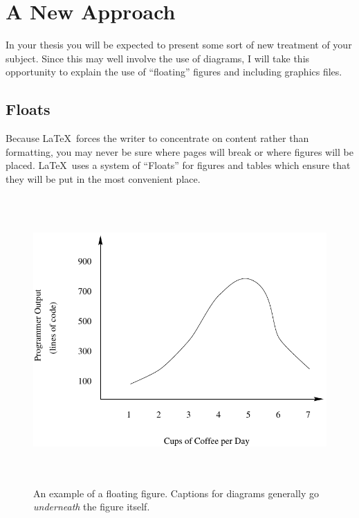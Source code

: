 \chapter{A New Approach}
\label{chap:diagrams}

In your thesis you will be expected to present some sort of new
treatment of your subject.  Since this may well involve the use
of diagrams, I will take this opportunity to explain the use of
``floating'' figures and including graphics files.

\section{Floats}
Because \LaTeX\ forces the writer to concentrate on content rather
than formatting, you may never be sure where pages will break or where
figures will be placed.  \LaTeX\ uses a system of ``Floats'' for
figures and tables which ensure that they will be put in the most
convenient place.

\begin{figure}[htb]
\begin{center}
\includegraphics[height = 110mm]{graph1.pdf}
\caption[An example of a floating figure.]{An example of a floating
         figure.  Captions for diagrams generally go {\em underneath} the
         figure itself.}
\label{fig:graph1}
\end{center}
\end{figure}

